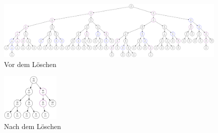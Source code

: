 \begin{figure}[hbtp]
    \centerline{\includegraphics[width = 1.2\textwidth]{img/gv/aufgabe1_6_before.pdf}}
    \caption{Vor dem Löschen}
    \label{fig:88before}
\end{figure}
\begin{figure}[hbtp]
    \centering
    \includegraphics[width = 0.25\textwidth]{img/gv/aufgabe1_6_after.pdf}
    \caption{Nach dem Löschen}
    \label{fig:88after}
\end{figure}
\FloatBarrier

